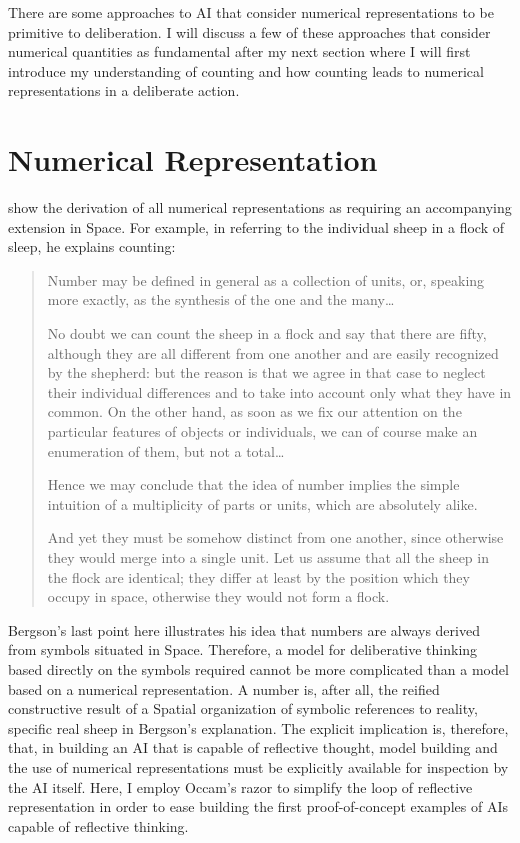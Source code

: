 There are some approaches to AI that consider numerical
representations to be primitive to deliberation.  I will discuss a few
of these approaches that consider numerical quantities as fundamental
after my next section where I will first introduce my understanding of
counting and how counting leads to numerical representations in a
deliberate action.

\section{Numerical Representation}
\label{section:numerical_representation}

\cite{bergson:1910} show the derivation of all numerical
representations as requiring an accompanying extension in Space.  For
example, in referring to the individual sheep in a flock of sleep, he
explains counting:

\begin{quote}
Number may be defined in general as a collection of units, or,
speaking more exactly, as the synthesis of the one and the
many\ldots

No doubt we can count the sheep in a flock and say that there are
fifty, although they are all different from one another and are easily
recognized by the shepherd: but the reason is that we agree in that
case to neglect their individual differences and to take into account
only what they have in common.  On the other hand, as soon as we fix
our attention on the particular features of objects or individuals, we
can of course make an enumeration of them, but not a total\ldots

Hence we may conclude that the idea of number implies the simple
intuition of a multiplicity of parts or units, which are absolutely
alike.

And yet they must be somehow distinct from one another, since
otherwise they would merge into a single unit.  Let us assume that all
the sheep in the flock are identical; they differ at least by the
position which they occupy in space, otherwise they would not form a
flock.
\end{quote}

Bergson's last point here illustrates his idea that numbers are always
derived from symbols situated in Space.  Therefore, a model for
deliberative thinking based directly on the symbols required cannot be
more complicated than a model based on a numerical representation.  A
number is, after all, the reified constructive result of a Spatial
organization of symbolic references to reality, specific real sheep in
Bergson's explanation.  The explicit implication is, therefore, that,
in building an AI that is capable of reflective thought, model
building and the use of numerical representations must be explicitly
available for inspection by the AI itself.  Here, I employ Occam's
razor to simplify the loop of reflective representation in order to
ease building the first proof-of-concept examples of AIs capable of
reflective thinking.

